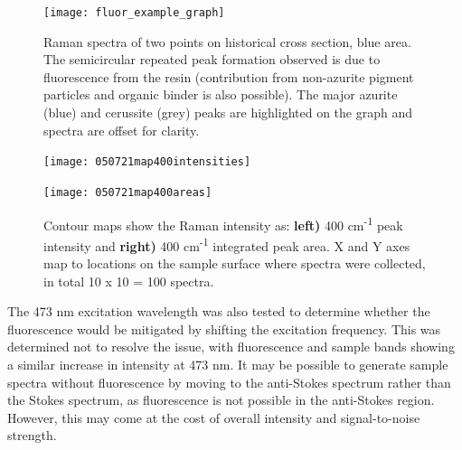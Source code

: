 \begin{figure}[H]
\centering
  \texttt{[image: fluor\_example\_graph]}
\caption[Raman spectra of historical cross section]{Raman spectra of two points on historical cross section, blue area. The semicircular repeated peak formation observed is due to fluorescence from the resin (contribution from non-azurite pigment particles and organic binder is also possible). The major azurite (blue) and cerussite (grey) peaks are highlighted on the graph and spectra are offset for clarity.}
\label{fig:fluor_example_graph}
\end{figure}


\begin{figure}[H]
\centering
\begin{minipage}{.45\textwidth}
  \centering
  \texttt{[image: 050721map400intensities]}
\end{minipage}
\begin{minipage}{.45\textwidth}
  \centering
  \texttt{[image: 050721map400areas]}
\end{minipage}
\caption[Contour maps, azurite Raman intensity in historical cross section]{Contour maps show the Raman intensity as: \textbf{left)} 400 cm\textsuperscript{-1} peak intensity and \textbf{right)} 400 cm\textsuperscript{-1} integrated peak area. X and Y axes map to locations on the sample surface where spectra were collected, in total 10 x 10 = 100 spectra.}
\label{fig:contours_xsection}
\end{figure}

The 473 nm excitation wavelength was also tested to determine whether the fluorescence would be mitigated by shifting the excitation frequency. This was determined not to resolve the issue, with fluorescence and sample bands showing a similar increase in intensity at 473 nm. It may be possible to generate sample spectra without fluorescence by moving to the anti-Stokes spectrum rather than the Stokes spectrum, as fluorescence is not possible in the anti-Stokes region. However, this may come at the cost of overall intensity and signal-to-noise strength.





